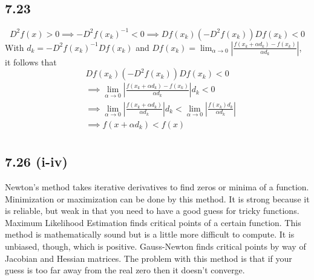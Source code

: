 \documentclass[letterpaper,12pt]{article}
\theoremstyle{definition}
\begin{document}
\subsection*{7.23}
\[D^2f(x) > 0 \implies -D^2f(x_k)^{-1} < 0 \implies Df(x_k)(-D^2f(x_k))Df(x_k) < 0\]
With $d_k = -D^2f(x_k)^{-1}Df(x_k)$ and $Df(x_k) = \lim_{\alpha \to 0} |\frac{f(x_k+\alpha d_k) - f(x_k)}{\alpha d_k}|$, it follows that\\
\[Df(x_k)(-D^2f(x_k))Df(x_k) < 0\]
\begin{align*}
&\implies  \lim_{\alpha \to 0} \left|\frac{f(x_k+\alpha d_k) - f(x_k)}{\alpha d_k}\right| d_k < 0\\
&\implies  \lim_{\alpha \to 0} \left|\frac{f(x_k+\alpha d_k)}{\alpha d_k}\right|d_k < \lim_{\alpha \to 0} \left|\frac{f(x_k)d_k}{\alpha d_k}\right|\\
&\implies f(x + \alpha d_k) < f(x)\\
\end{align*}

\subsection*{7.26 (i-iv)}
Newton's method takes iterative derivatives to find zeros or minima of a function. Minimization or maximization can be done by this method. It is strong because it is reliable, but weak in that you need to have a good guess for tricky functions.
Maximum Likelihood Estimation finds critical points of a certain function. This method is mathematically sound but is a little more difficult to compute. It is unbiased, though, which is positive.
Gauss-Newton finds critical points by way of Jacobian and Hessian matrices. The problem with this method is that if your guess is too far away from the real zero then it doesn't converge. 
\end{document}
